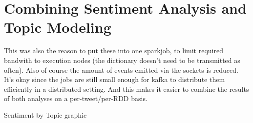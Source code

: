 \chapter{Combining Sentiment Analysis and Topic Modeling}
\label{ch:combiningSentimentAnalysisAndTopicModeling}

This was also the reason to put these into one sparkjob, to limit required bandwith to execution nodes (the dictionary doesn't need to be transmitted as often).
Also of course the amount of events emitted via the sockets is reduced.
It's okay since the jobs are still small enough for kafka to distribute them efficiently in a distributed setting.
And this makes it easier to combine the results of both analyses on a per-tweet/per-RDD basis.

Sentiment by Topic graphic


